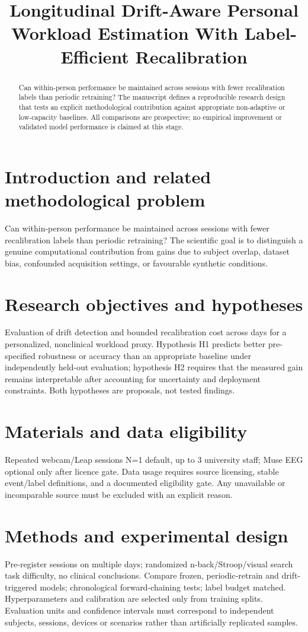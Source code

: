 \documentclass[11pt,a4paper]{article}
\title{Longitudinal Drift-Aware Personal Workload Estimation With Label-Efficient Recalibration}
\author{}
\date{}
\begin{document}
\maketitle
\begin{abstract}
Can within-person performance be maintained across sessions with fewer recalibration labels than periodic retraining? The manuscript defines a reproducible research design that tests an explicit methodological contribution against appropriate non-adaptive or low-capacity baselines. All comparisons are prospective; no empirical improvement or validated model performance is claimed at this stage.
\end{abstract}
\section{Introduction and related methodological problem}
Can within-person performance be maintained across sessions with fewer recalibration labels than periodic retraining? The scientific goal is to distinguish a genuine computational contribution from gains due to subject overlap, dataset bias, confounded acquisition settings, or favourable synthetic conditions.
\section{Research objectives and hypotheses}
Evaluation of drift detection and bounded recalibration cost across days for a personalized, nonclinical workload proxy. Hypothesis H1 predicts better pre-specified robustness or accuracy than an appropriate baseline under independently held-out evaluation; hypothesis H2 requires that the measured gain remains interpretable after accounting for uncertainty and deployment constraints. Both hypotheses are proposals, not tested findings.
\section{Materials and data eligibility}
Repeated webcam/Leap sessions N=1 default, up to 3 university staff; Muse EEG optional only after licence gate. Data usage requires source licensing, stable event/label definitions, and a documented eligibility gate. Any unavailable or incomparable source must be excluded with an explicit reason.
\section{Methods and experimental design}
Pre-register sessions on multiple days; randomized n-back/Stroop/visual search task difficulty, no clinical conclusions. Compare frozen, periodic-retrain and drift-triggered models; chronological forward-chaining tests; label budget matched. Hyperparameters and calibration are selected only from training splits. Evaluation units and confidence intervals must correspond to independent subjects, sessions, devices or scenarios rather than artificially replicated samples.
\end{document}
